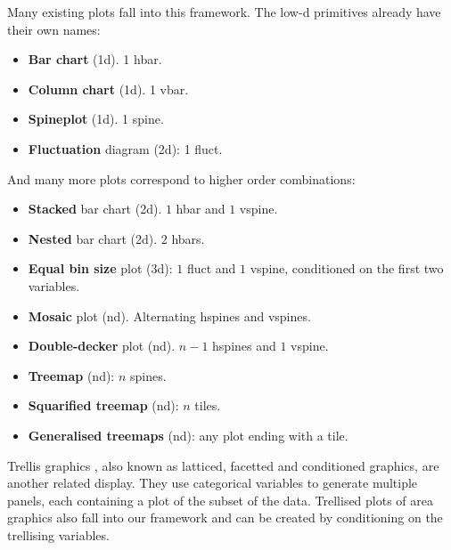 \documentclass[journal]{vgtc}
\begin{document}
Many existing plots fall into this framework. The low-d primitives already have their own names:

\begin{itemize}
  \setlength{\itemsep}{0em}
  \item {\bf Bar chart} (1d). 1 hbar.
  \item {\bf Column chart} (1d). 1 vbar.
  \item {\bf Spineplot} (1d). 1 spine.
  \item {\bf Fluctuation} diagram (2d): 1 fluct.
\end{itemize}

\noindent And many more plots correspond to higher order combinations:

\begin{itemize}
  \setlength{\itemsep}{0em}
  
  \item {\bf Stacked} bar chart (2d). $1$ hbar and $1$ vspine.

  \item {\bf Nested} bar chart \citep{peltier:2009} (2d). $2$ hbars. 

  \item {\bf Equal bin size} plot \citep{hofmann:2000} (3d): $1$ fluct and $1$ vspine, conditioned on the first two variables.

  \item {\bf Mosaic} plot \citep{hartigan:1981,friendly:1994,hofmann:2003} (nd). Alternating hspines and vspines. 

  \item {\bf Double-decker} plot \citep{hofmann:2001} (nd). $n-1$ hspines and $1$ vspine. 

  \item {\bf Treemap} \citep{shneiderman:1992} (nd): $n$ spines.

  \item {\bf Squarified treemap} \citep{bruls:1999} (nd): $n$ tiles.

  \item {\bf Generalised treemaps} \citep{vliegen:2006} (nd): any plot ending with a tile.

\end{itemize}

Trellis graphics \citep{becker:1996}, also known as latticed, facetted and conditioned graphics, are another related display. They use categorical variables to generate multiple panels, each containing a plot of the subset of the data. Trellised plots of area graphics also fall into our framework and can be created by conditioning on the trellising variables.
\end{document}
